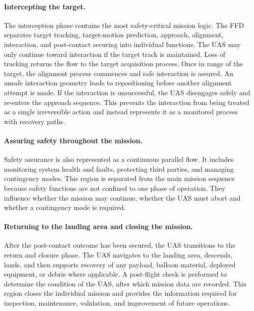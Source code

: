 \paragraph{Intercepting the target.}
The interception phase contains the most safety-critical mission logic. The FFD separates target tracking, target-motion prediction, approach, alignment, interaction, and post-contact securing into individual functions. The UAS may only continue toward interaction if the target track is maintained. Loss of tracking returns the flow to the target acquisition process. Once in range of the target, the alignment process commences and safe interaction is assured. An unsafe interaction geometry leads to repositioning before another alignment attempt is made. If the interaction is unsuccessful, the UAS disengages safely and re-enters the approach sequence. This prevents the interaction from being treated as a single irreversible action and instead represents it as a monitored process with recovery paths.
\vspace{-10pt}

\paragraph{Assuring safety throughout the mission.}
Safety assurance is also represented as a continuous parallel flow. It includes monitoring system health and faults, protecting third parties, and managing contingency modes. This region is separated from the main mission sequence because safety functions are not confined to one phase of operation. They influence whether the mission may continue, whether the UAS must abort and whether a contingency mode is required.
\vspace{-10pt}

\paragraph{Returning to the landing area and closing the mission.}
After the post-contact outcome has been secured, the UAS transitions to the return and closure phase. The UAS navigates to the landing area, descends, lands, and then supports recovery of any payload, balloon material, deployed equipment, or debris where applicable. A post-flight check is performed to determine the condition of the UAS, after which mission data are recorded. This region closes the individual mission and provides the information required for inspection, maintenance, validation, and improvement of future operations.
\vspace{-15pt}

